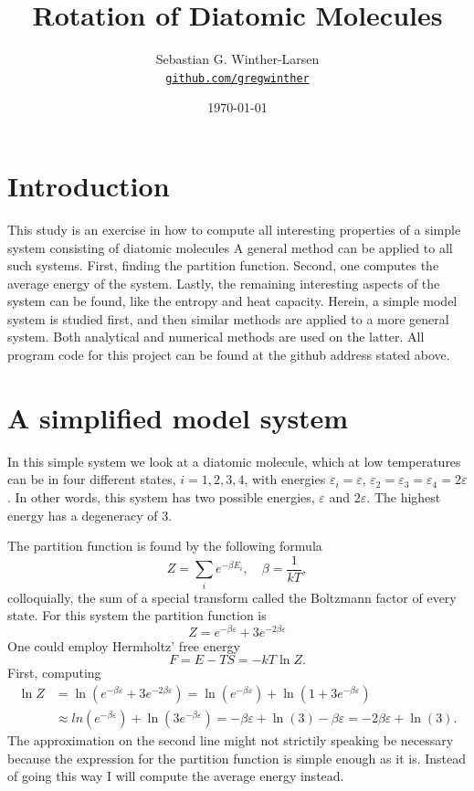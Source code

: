 \documentclass[10pt,a4paper]{amsart}
\title[Rotation of Diatomic Molecules]{Rotation of Diatomic Molecules \\
	\hrulefill\fbox{FYS2160}\hrulefill}
\author[Winther-Larsen]{Sebastian G. Winther-Larsen\\
\href{https://github.com/gregwinther/FYS2160/}{\texttt{github.com/gregwinther}}}
\date{\today}
\begin{document}
\maketitle

\section{Introduction}
This study is an exercise in how to compute all interesting properties of a simple system consisting of diatomic molecules A general method can be applied to all such systems. First, finding the partition function. Second, one computes the average energy of the system. Lastly, the remaining interesting aspects of the system can be found, like the entropy and heat capacity. Herein, a simple model system is studied first, and then similar methods are applied to a more general system. Both analytical and numerical methods are used on the latter. All program code for this project can be found at the github address stated above.

\section{A simplified model system}
In this simple system we look at a diatomic molecule, which at low temperatures can be in four different states, $i=1,2,3,4$, with energies $\varepsilon_i=\varepsilon$, $\varepsilon_2=\varepsilon_3=\varepsilon_4=2\varepsilon$. In other words, this system has two possible energies, $\varepsilon$ and $2\varepsilon$. The highest energy has a degeneracy of $3$.

The partition function is found by the following formula
\begin{equation}
Z = \sum_ie^{-\beta E_i},\quad \beta=\frac{1}{kT},
\end{equation}
colloquially, the sum of a special transform called the Boltzmann factor of every state. For this system the partition function is
\begin{equation}
Z = e^{-\beta\varepsilon}+3e^{-2\beta\varepsilon}
\end{equation}
One could employ Hermholtz' free energy
\begin{equation}
F = E - TS= -kT\ln Z.
\end{equation}
First, computing
\begin{align*}
\ln Z &= \ln (e^{-\beta\varepsilon}+3e^{-2\beta\varepsilon} ) = \ln( e^{-\beta\varepsilon}) + \ln(1+3e^{-\beta\varepsilon} ) \\
&\approx ln( e^{-\beta\varepsilon}) + \ln(3e^{-\beta\varepsilon} )  = -\beta\varepsilon + \ln(3) -\beta\varepsilon  = -2\beta\varepsilon + \ln(3).
\end{align*}
The approximation on the second line might not strictily speaking be necessary because the expression for the partition function is simple enough as it is. Instead of going this way I will compute the average energy instead.
\end{document}
